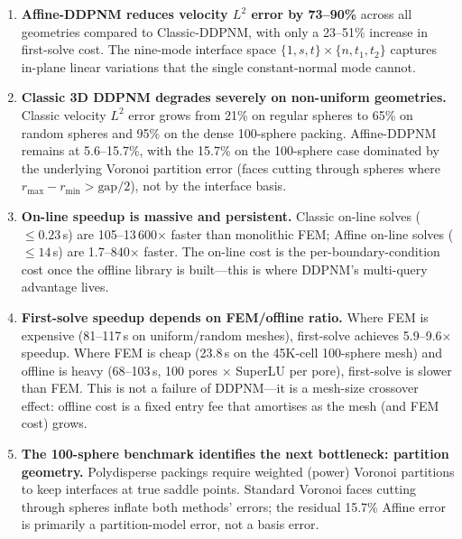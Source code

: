 \documentclass[11pt,a4paper]{article}
\begin{document}
\begin{enumerate}
  \item \textbf{Affine-DDPNM reduces velocity $L^2$ error by 73--90\%}
    across all geometries compared to Classic-DDPNM, with only a
    23--51\% increase in first-solve cost. The nine-mode interface
    space $\{1,s,t\}\times\{n,t_1,t_2\}$ captures in-plane linear
    variations that the single constant-normal mode cannot.

  \item \textbf{Classic 3D DDPNM degrades severely on non-uniform
    geometries.}  Classic velocity $L^2$ error grows from 21\% on
    regular spheres to 65\% on random spheres and 95\% on the dense
    100-sphere packing.  Affine-DDPNM remains at 5.6--15.7\%, with
    the 15.7\% on the 100-sphere case dominated by the underlying
    Voronoi partition error (faces cutting through spheres where
    $r_{\max}-r_{\min} > \text{gap}/2$), not by the interface basis.

  \item \textbf{On-line speedup is massive and persistent.}
    Classic on-line solves ($\le 0.23$\,s) are 105--13\,600$\times$ faster
    than monolithic FEM; Affine on-line solves ($\le 14$\,s) are
    1.7--840$\times$ faster.  The on-line cost is the per-boundary-condition
    cost once the offline library is built---this is where DDPNM's
    multi-query advantage lives.

  \item \textbf{First-solve speedup depends on FEM/offline ratio.}
    Where FEM is expensive (81--117\,s on uniform/random meshes),
    first-solve achieves 5.9--9.6$\times$ speedup.  Where FEM is cheap
    (23.8\,s on the 45K-cell 100-sphere mesh) and offline is heavy
    (68--103\,s, 100 pores $\times$ SuperLU per pore), first-solve is
    slower than FEM.  This is not a failure of DDPNM---it is a mesh-size
    crossover effect: offline cost is a fixed entry fee that amortises
    as the mesh (and FEM cost) grows.

  \item \textbf{The 100-sphere benchmark identifies the next
    bottleneck: partition geometry.}  Polydisperse packings require
    weighted (power) Voronoi partitions to keep interfaces at true
    saddle points.  Standard Voronoi faces cutting through spheres
    inflate both methods' errors; the residual 15.7\% Affine error
    is primarily a partition-model error, not a basis error.
\end{enumerate}
\end{document}
